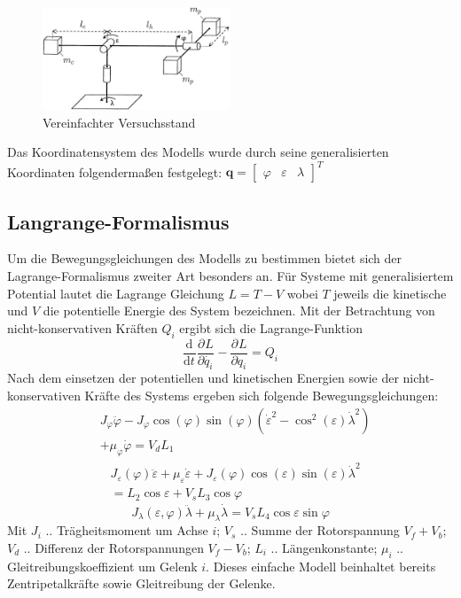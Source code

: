 \documentclass[times, 10pt,twocolumn]{article}
\newcommand{\partiell}[3][]{\frac{\partial^{#1}#2}{\partial{#3}^{#1}}}
\newcommand{\diff}[3][]{\frac{\mathrm{d}^{#1}#2}{\mathrm{d}{#3}^{#1}}}
\begin{document}
	\begin{figure}[ht]
		\centering
		\includegraphics[width=0.5\textwidth]{images/setup}
		\caption{Vereinfachter Versuchsstand}
		\label{setup}
	\end{figure}
	Das Koordinatensystem des Modells wurde durch seine generalisierten Koordinaten folgendermaßen festgelegt: $\bm q = \begin{bmatrix}
	\varphi & \varepsilon & \lambda
	\end{bmatrix}^T $

	\subsection{Langrange-Formalismus}

	Um die Bewegungsgleichungen des Modells zu bestimmen bietet sich der Lagrange-Formalismus zweiter Art besonders an. Für Systeme mit generalisiertem Potential lautet die Lagrange Gleichung $L = T -V$ wobei $T$ jeweils die kinetische und $V$ die potentielle Energie des System bezeichnen.
	Mit der Betrachtung von nicht-konservativen Kräften $Q_i$ ergibt sich die Lagrange-Funktion
	\begin{equation}\label{eq:lagrange}
	\diff{}{t} \partiell{L}{\dot{q_i}} - \partiell{L}{q_i}=Q_i
	\end{equation}
	Nach dem einsetzen der potentiellen und kinetischen Energien sowie der nicht-konservativen Kräfte des Systems ergeben sich folgende Bewegungsgleichungen:
	\begin{equation}
	\begin{split}
	&J_\varphi \ddot{\varphi} - J_\varphi \cos (\varphi) \sin (\varphi) (\dot{\varepsilon}^2- \cos^2 (\varepsilon) \dot{\lambda}^2)\\  &+ \mu_\varphi \dot{\varphi} = V_d L_1
	\end{split}
	\end{equation}
	\begin{equation}
	\begin{split}
	&J_\varepsilon(\varphi)\ddot{\varepsilon} + \mu_\varepsilon \dot{\varepsilon} + J_\varepsilon(\varphi) \cos (\varepsilon) \sin (\varepsilon) \dot{\lambda}^2\\
	&= L_2 \cos \varepsilon + V_s L_3 \cos \varphi
	\end{split}
	\end{equation}
	\begin{equation}
	J_\lambda(\varepsilon,\varphi) \ddot{\lambda} + \mu_\lambda \dot{\lambda} = V_s L_4 \cos \varepsilon \sin \varphi
	\end{equation}
	Mit $J_i$ .. Trägheitsmoment um Achse $i$; $V_s$ .. Summe der Rotorspannung $V_f + V_b$; $V_d$ .. Differenz der Rotorspannungen $V_f - V_b$; $L_i$ .. Längenkonstante; $\mu_i$ .. Gleitreibungskoeffizient um Gelenk $i$. Dieses einfache Modell beinhaltet bereits Zentripetalkräfte sowie Gleitreibung der Gelenke.
\end{document}
